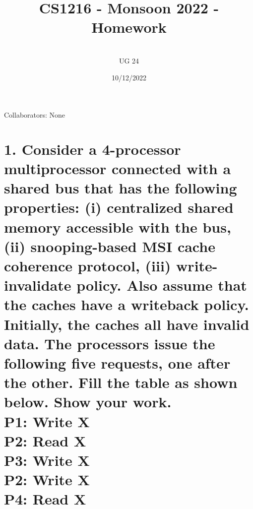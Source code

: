 \documentclass[11pt]{article}
\title{CS1216 - Monsoon 2022 - Homework \Homework}
\author{\Name 
\\UG 24 \SID
}
\date{10/12/2022}
\begin{document}
\maketitle

Collaborators: None

\section*{1. Consider a 4-processor multiprocessor connected with a shared bus that has the following properties: (i) centralized shared memory accessible with the bus, (ii) snooping-based MSI cache coherence protocol, (iii) write-invalidate policy. Also assume that the caches have a writeback policy. Initially, the caches all have invalid data. The processors issue the following five requests, one after the other. Fill the table as shown below. Show your work.
\\P1: Write X
\\P2: Read X
\\P3: Write X
\\P2: Write X
\\P4: Read X}
\end{document}
